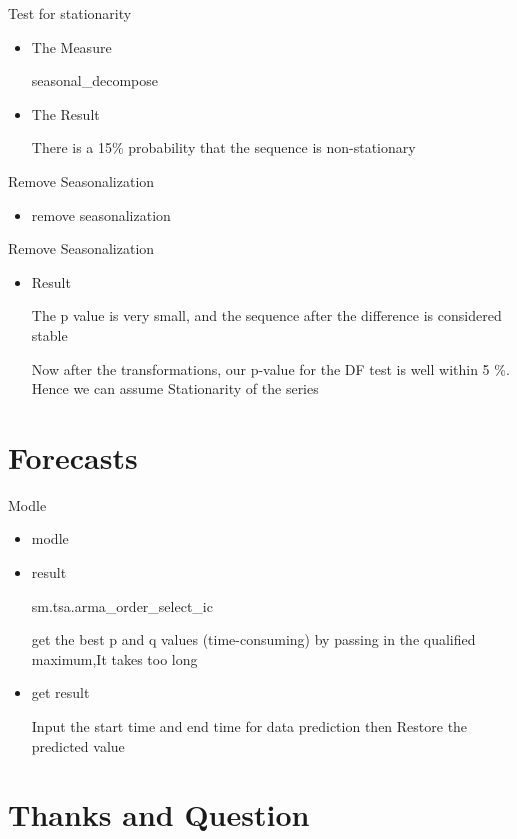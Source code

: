 \documentclass[
 size=12pt,
 paper=smartboard, %
 mode=present, %
 display=slides, %
style=tuliplab,
pauseslide,
fleqn,leqno]{powerdot}
\begin{document}
\begin{slide}{Test for stationarity}
\begin{itemize}
\item The Measure
\par
seasonal_decompose
\item The Result
\par
\par
There is a 15\% probability that the sequence is non-stationary
\end{itemize}
\end{slide}


\begin{slide}{Remove  Seasonalization }
\begin{itemize}[type=1]
\item remove seasonalization
\par
\par
\end{itemize}
\end{slide}



\begin{slide}{Remove  Seasonalization }
\begin{itemize}[type=1]
\item Result
\par
\par
The p value is very small, and the sequence after the difference is considered stable \par
Now after the transformations, our p-value for the DF test is well within 5 \%. Hence we can assume Stationarity of the series
\end{itemize}
\end{slide}





\section{Forecasts}
\begin{slide}{Modle }
\begin{itemize}[type=1]
\item modle
\par
\item result
\par
sm.tsa.arma_order_select_ic\par
get the best p and q values (time-consuming) by passing in the qualified maximum,It takes too long
\item get result
\par
Input the start time and end time for data prediction
then Restore the predicted value
\end{itemize}
\end{slide}

\section{Thanks and Question}
\end{document}
